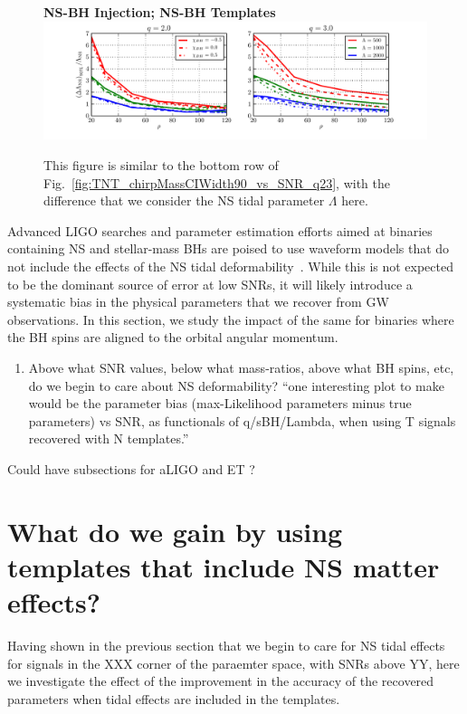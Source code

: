 \documentclass[aps,prd,amsmath,floats,floatfix, twocolumn,
superscriptaddress,nofootinbib,showpacs]{revtex4-1}
\begin{document}
% 
\begin{figure}
\centering
\textbf{NS-BH Injection; NS-BH Templates}
\includegraphics[width=1.7\columnwidth]{plots/TT_NSLambdaCIWidth90_vs_SNR_q23.pdf}
\caption{This figure is similar to the bottom row of
Fig.~\ref{fig:TNT_chirpMassCIWidth90_vs_SNR_q23}, with the difference that  
we consider the NS tidal parameter $\Lambda$ here.}
\label{fig:TT_NSLambdaCIWidth90_vs_SNR_q23}
\end{figure}
% 
% 
Advanced LIGO searches and parameter estimation efforts aimed at binaries 
containing NS and stellar-mass BHs are poised to use waveform models that do not
include the effects of the NS tidal deformability~\cite{Canton:2014ena}.
While this is not expected to
be the dominant source of error at low SNRs, it will likely introduce a
systematic bias in the physical parameters that we recover from GW observations.
In this section, we study the impact of the same for binaries where the BH spins
are aligned to the orbital angular momentum.

\begin{enumerate}
\item Above what SNR values, below what mass-ratios, above what BH spins, etc, 
do we begin to care about NS deformability?\newline
``one interesting plot to make would be the parameter bias (max-Likelihood
parameters minus true parameters) vs SNR, as functionals of q/sBH/Lambda, when
using T signals recovered with N templates.''
\end{enumerate}


Could have subsections for aLIGO and ET ?

\section{What do we gain by using templates that include NS matter effects?}
Having shown in the previous section that we begin to care for NS tidal effects
for signals in the XXX corner of the paraemter space, with SNRs above YY, here
we investigate the effect of the improvement in the accuracy of the recovered
parameters when tidal effects are included in the templates.
\end{document}
